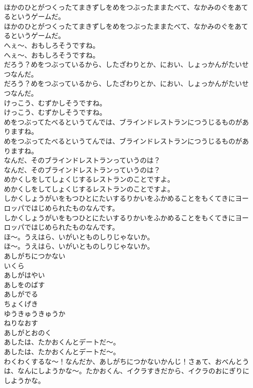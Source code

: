 \documentclass[8pt]{extreport}
\begin{document}
\begin{CJK}{UTF8}{min}
\\	ほかのひとがつくったてまきずしをめをつぶったままたべて、なかみのぐをあてるというゲームだ。
\\	ほかのひとがつくったてまきずしをめをつぶったままたべて、なかみのぐをあてるというゲームだ。
\\	へぇ～、おもしろそうですね。
\\	へぇ～、おもしろそうですね。
\\	だろう？めをつぶっているから、したざわりとか、におい、しょっかんがたいせつなんだ。
\\	だろう？めをつぶっているから、したざわりとか、におい、しょっかんがたいせつなんだ。
\\	けっこう、むずかしそうですね。
\\	けっこう、むずかしそうですね。
\\	めをつぶってたべるというてんでは、ブラインドレストランにつうじるものがありますね。
\\	めをつぶってたべるというてんでは、ブラインドレストランにつうじるものがありますね。
\\	なんだ、そのブラインドレストランっていうのは？
\\	なんだ、そのブラインドレストランっていうのは？
\\	めかくしをしてしょくじするレストランのことですよ。
\\	めかくしをしてしょくじするレストランのことですよ。
\\	しかくしょうがいをもつひとにたいするりかいをふかめることをもくてきにヨーロッパではじめられたものなんです。
\\	しかくしょうがいをもつひとにたいするりかいをふかめることをもくてきにヨーロッパではじめられたものなんです。
\\	ほ～。うえはら、いがいとものしりじゃないか。
\\	ほ～。うえはら、いがいとものしりじゃないか。
\\	あしがちにつかない
\\	いくら
\\	あしがはやい
\\	あしをのばす
\\	あしがでる
\\	ちょくげき
\\	ゆうきゅうきゅうか
\\	ねりなおす
\\	あしがとおのく
\\	あしたは、たかおくんとデートだ～。
\\	あしたは、たかおくんとデートだ～。
\\	わくわくするな～！なんだか、あしがちにつかないかんじ！さぁて、おべんとうは、なんにしようかな～。たかおくん、イクラすきだから、イクラのおにぎりにしようかな。

\end{CJK}
\end{document}
